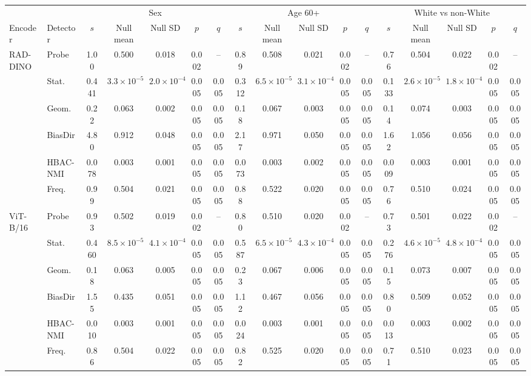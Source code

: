 \begin{tabular}{llccccccccccccccc}
\toprule
 & & \multicolumn{5}{c}{Sex} & \multicolumn{5}{c}{Age 60+} & \multicolumn{5}{c}{White vs non-White} \\
\cmidrule(lr){3-7} \cmidrule(lr){8-12} \cmidrule(lr){13-17}
Encoder & Detector & $s$ & Null mean & Null SD & $p$ & $q$ & $s$ & Null mean & Null SD & $p$ & $q$ & $s$ & Null mean & Null SD & $p$ & $q$ \\
\midrule
RAD-DINO & Probe & 1.00 & 0.500 & 0.018 & 0.002 & -- & 0.89 & 0.508 & 0.021 & 0.002 & -- & 0.76 & 0.504 & 0.022 & 0.002 & -- \\
 & Stat. & 0.441 & $3.3{\times}10^{-5}$ & $2.0{\times}10^{-4}$ & 0.005 & 0.005 & 0.312 & $6.5{\times}10^{-5}$ & $3.1{\times}10^{-4}$ & 0.005 & 0.005 & 0.133 & $2.6{\times}10^{-5}$ & $1.8{\times}10^{-4}$ & 0.005 & 0.005 \\
 & Geom. & 0.22 & 0.063 & 0.002 & 0.005 & 0.005 & 0.18 & 0.067 & 0.003 & 0.005 & 0.005 & 0.14 & 0.074 & 0.003 & 0.005 & 0.005 \\
 & BiasDir & 4.80 & 0.912 & 0.048 & 0.005 & 0.005 & 2.17 & 0.971 & 0.050 & 0.005 & 0.005 & 1.62 & 1.056 & 0.056 & 0.005 & 0.005 \\
 & HBAC-NMI & 0.078 & 0.003 & 0.001 & 0.005 & 0.005 & 0.073 & 0.003 & 0.002 & 0.005 & 0.005 & 0.009 & 0.003 & 0.001 & 0.005 & 0.005 \\
 & Freq. & 0.99 & 0.504 & 0.021 & 0.005 & 0.005 & 0.88 & 0.522 & 0.020 & 0.005 & 0.005 & 0.76 & 0.510 & 0.024 & 0.005 & 0.005 \\
\midrule
ViT-B/16 & Probe & 0.93 & 0.502 & 0.019 & 0.002 & -- & 0.80 & 0.510 & 0.020 & 0.002 & -- & 0.73 & 0.501 & 0.022 & 0.002 & -- \\
 & Stat. & 0.460 & $8.5{\times}10^{-5}$ & $4.1{\times}10^{-4}$ & 0.005 & 0.005 & 0.587 & $6.5{\times}10^{-5}$ & $4.3{\times}10^{-4}$ & 0.005 & 0.005 & 0.276 & $4.6{\times}10^{-5}$ & $4.8{\times}10^{-4}$ & 0.005 & 0.005 \\
 & Geom. & 0.18 & 0.063 & 0.005 & 0.005 & 0.005 & 0.23 & 0.067 & 0.006 & 0.005 & 0.005 & 0.15 & 0.073 & 0.007 & 0.005 & 0.005 \\
 & BiasDir & 1.55 & 0.435 & 0.051 & 0.005 & 0.005 & 1.12 & 0.467 & 0.056 & 0.005 & 0.005 & 0.80 & 0.509 & 0.052 & 0.005 & 0.005 \\
 & HBAC-NMI & 0.010 & 0.003 & 0.001 & 0.005 & 0.005 & 0.024 & 0.003 & 0.001 & 0.005 & 0.005 & 0.013 & 0.003 & 0.002 & 0.005 & 0.005 \\
 & Freq. & 0.86 & 0.504 & 0.022 & 0.005 & 0.005 & 0.82 & 0.525 & 0.020 & 0.005 & 0.005 & 0.71 & 0.510 & 0.023 & 0.005 & 0.005 \\

\end{tabular}
